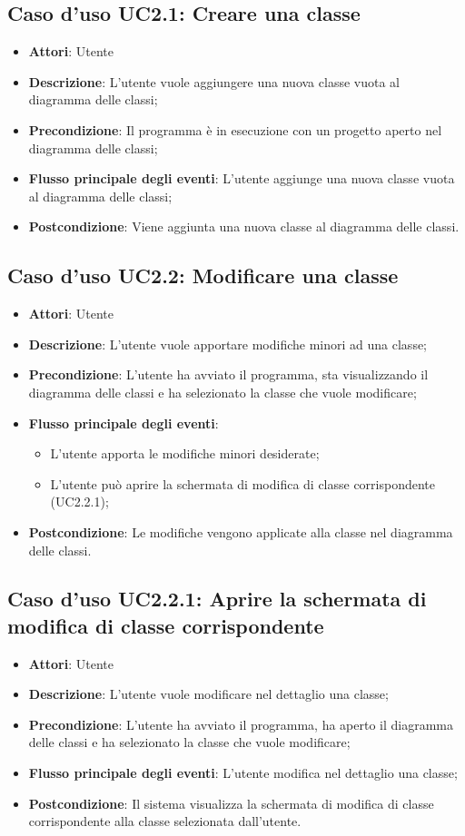 \documentclass[../AnalisiDeiRequisiti.tex]{subfiles}
\begin{document}
	\subsection{Caso d'uso UC2.1: Creare una classe}
	\begin{itemize}
		\item \textbf{Attori}: Utente
		\item \textbf{Descrizione}: L'utente vuole aggiungere una nuova classe vuota al diagramma delle classi;
		\item \textbf{Precondizione}: Il programma è in esecuzione con un progetto aperto nel diagramma delle classi;
		\item \textbf{Flusso principale degli eventi}: L'utente aggiunge una nuova classe vuota al diagramma delle classi;
		\item \textbf{Postcondizione}: Viene aggiunta una nuova classe al diagramma delle classi.
	\end{itemize}
	\subsection{Caso d'uso UC2.2: Modificare una classe}
	\begin{itemize}
		\item \textbf{Attori}: Utente
		\item \textbf{Descrizione}: L'utente vuole apportare modifiche minori ad una classe;
		\item \textbf{Precondizione}: L'utente ha avviato il programma, sta visualizzando il diagramma delle classi e ha selezionato la classe che vuole modificare;
		\item \textbf{Flusso principale degli eventi}: \begin{itemize}
			\item L'utente apporta le modifiche minori desiderate;
			\item L'utente può aprire la schermata di modifica di classe corrispondente (UC2.2.1);
		\end{itemize}
		\item \textbf{Postcondizione}: Le modifiche vengono applicate alla classe nel diagramma delle classi.
	\end{itemize}
	\subsection{Caso d'uso UC2.2.1: Aprire la schermata di modifica di classe corrispondente}
	\begin{itemize}
		\item \textbf{Attori}: Utente
		\item \textbf{Descrizione}: L'utente vuole modificare nel dettaglio una classe;
		\item \textbf{Precondizione}: L'utente ha avviato il programma, ha aperto il diagramma delle classi e ha selezionato la classe che vuole modificare;
		\item \textbf{Flusso principale degli eventi}: L'utente modifica nel dettaglio una classe;
		\item \textbf{Postcondizione}: Il sistema visualizza la schermata di modifica di classe corrispondente alla classe selezionata dall'utente.
	\end{itemize}
\end{document}
